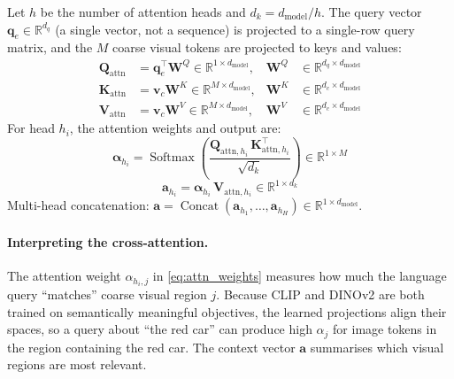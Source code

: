 \documentclass[12pt,a4paper]{article}
\DeclareMathOperator{\Softmax}{Softmax}
\DeclareMathOperator{\Concat}{Concat}
\newcommand{\R}{\mathbb{R}}
\newcommand{\vv}{\mathbf{v}}     %
\newcommand{\vq}{\mathbf{q}}     %
\begin{document}
\begin{mathbox}[title={Cross-Attention in TPN}]
Let $h$ be the number of attention heads and $d_k = d_{\mathrm{model}} / h$.
The query vector $\vq_e \in \R^{d_q}$ (a single vector, not a sequence) is
projected to a single-row query matrix, and the $M$ coarse visual tokens are
projected to keys and values:
\begin{align}
  \mathbf{Q}_{\mathrm{attn}} &= \vq_e^\top \mathbf{W}^Q
    \in \R^{1 \times d_{\mathrm{model}}},
    & \mathbf{W}^Q &\in \R^{d_q \times d_{\mathrm{model}}}
    \label{eq:q_proj} \\
  \mathbf{K}_{\mathrm{attn}} &= \vv_c \mathbf{W}^K
    \in \R^{M \times d_{\mathrm{model}}},
    & \mathbf{W}^K &\in \R^{d_c \times d_{\mathrm{model}}}
    \label{eq:k_proj} \\
  \mathbf{V}_{\mathrm{attn}} &= \vv_c \mathbf{W}^V
    \in \R^{M \times d_{\mathrm{model}}},
    & \mathbf{W}^V &\in \R^{d_c \times d_{\mathrm{model}}}
    \label{eq:v_proj}
\end{align}
For head $h_i$, the attention weights and output are:
\begin{equation}
  \boldsymbol{\alpha}_{h_i} = \Softmax\!\left(
    \frac{\mathbf{Q}_{\mathrm{attn},h_i}\, \mathbf{K}_{\mathrm{attn},h_i}^\top}
      {\sqrt{d_k}}\right) \in \R^{1 \times M}
  \label{eq:attn_weights}
\end{equation}
\begin{equation}
  \mathbf{a}_{h_i} = \boldsymbol{\alpha}_{h_i}\, \mathbf{V}_{\mathrm{attn},h_i}
    \in \R^{1 \times d_k}
  \label{eq:attn_out}
\end{equation}
Multi-head concatenation: $\mathbf{a} = \Concat(\mathbf{a}_{h_1}, \ldots,
\mathbf{a}_{h_H}) \in \R^{1 \times d_{\mathrm{model}}}$.
\end{mathbox}

\paragraph{Interpreting the cross-attention.}
The attention weight $\alpha_{h_i, j}$ in \cref{eq:attn_weights} measures how
much the language query ``matches'' coarse visual region $j$. Because CLIP and
DINOv2 are both trained on semantically meaningful objectives, the learned
projections align their spaces, so a query about ``the red car'' can produce high
$\alpha_{j}$ for image tokens in the region containing the red car. The context
vector $\mathbf{a}$ summarises which visual regions are most relevant.
\end{document}
